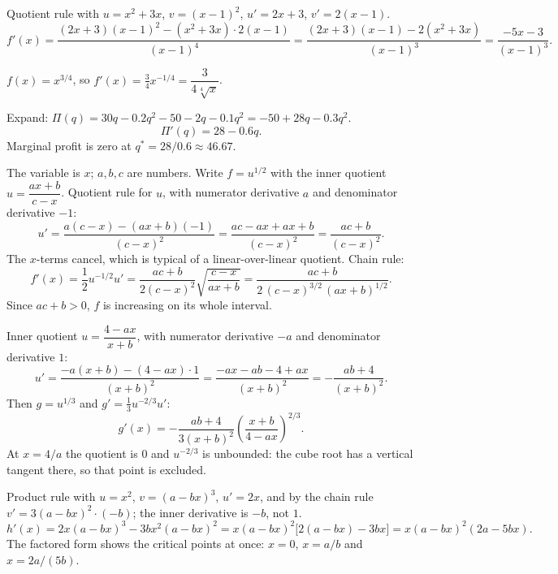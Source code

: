 \begin{solutions}
  \item Quotient rule with $u=x^{2}+3x$, $v=(x-1)^{2}$, $u'=2x+3$,
        $v'=2(x-1)$.
        \[
          f'(x)=\frac{(2x+3)(x-1)^{2}-(x^{2}+3x)\cdot 2(x-1)}{(x-1)^{4}}
               =\frac{(2x+3)(x-1)-2(x^{2}+3x)}{(x-1)^{3}}
               =\frac{-5x-3}{(x-1)^{3}} .
        \]

  \item $f(x)=x^{3/4}$, so $f'(x)=\tfrac34x^{-1/4}=\dfrac{3}{4\sqrt[4]{x}}$.

  \item Expand: $\Pi(q)=30q-0.2q^{2}-50-2q-0.1q^{2}
        =-50+28q-0.3q^{2}$.
        \[
          \Pi'(q)=28-0.6q .
        \]
        Marginal profit is zero at $q^{*}=28/0.6\approx 46.67$.

  \item The variable is $x$; $a,b,c$ are numbers. Write
        $f=u^{1/2}$ with the inner quotient $u=\dfrac{ax+b}{c-x}$. Quotient
        rule for $u$, with numerator derivative $a$ and denominator
        derivative $-1$:
        \[
          u'=\frac{a(c-x)-(ax+b)(-1)}{(c-x)^{2}}
            =\frac{ac-ax+ax+b}{(c-x)^{2}}=\frac{ac+b}{(c-x)^{2}} .
        \]
        The $x$-terms cancel, which is typical of a
        linear-over-linear quotient. Chain rule:
        \[
          f'(x)=\frac{1}{2}u^{-1/2}u'
               =\frac{ac+b}{2(c-x)^{2}}\sqrt{\frac{c-x}{ax+b}}
               =\frac{ac+b}{2\,(c-x)^{3/2}\,(ax+b)^{1/2}} .
        \]
        Since $ac+b>0$, $f$ is increasing on its whole interval.

  \item Inner quotient $u=\dfrac{4-ax}{x+b}$, with numerator derivative
        $-a$ and denominator derivative $1$:
        \[
          u'=\frac{-a(x+b)-(4-ax)\cdot1}{(x+b)^{2}}
            =\frac{-ax-ab-4+ax}{(x+b)^{2}}=-\frac{ab+4}{(x+b)^{2}} .
        \]
        Then $g=u^{1/3}$ and $g'=\tfrac13u^{-2/3}u'$:
        \[
          g'(x)=-\frac{ab+4}{3(x+b)^{2}}
                \left(\frac{x+b}{4-ax}\right)^{2/3} .
        \]
        At $x=4/a$ the quotient is $0$ and $u^{-2/3}$ is unbounded: the cube
        root has a vertical tangent there, so that point is excluded.

  \item Product rule with $u=x^{2}$, $v=(a-bx)^{3}$, $u'=2x$, and by the
        chain rule $v'=3(a-bx)^{2}\cdot(-b)$; the inner derivative is $-b$,
        not $1$.
        \[
          h'(x)=2x(a-bx)^{3}-3bx^{2}(a-bx)^{2}
               =x(a-bx)^{2}\bigl[2(a-bx)-3bx\bigr]
               =x(a-bx)^{2}(2a-5bx) .
        \]
        The factored form shows the critical points at once: $x=0$,
        $x=a/b$ and $x=2a/(5b)$.
\end{solutions}
